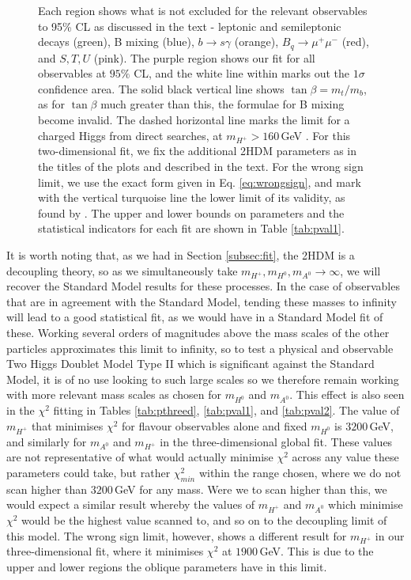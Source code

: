 \documentclass[a4paper,12pt]{article}
\begin{document}
\begin{figure}[ht]
{    Each region shows what is not excluded for the relevant observables to 95\% CL as discussed in the text - leptonic and semileptonic decays (green), B mixing (blue), $b\to s\gamma$ (orange), $B_q\to\mu^+\mu^-$ (red), and $S,T,U$ (pink).
    The purple region shows our fit for all observables at $95\%$ CL, and the white line within marks out the $1\sigma$ confidence area. 
    The solid black vertical line shows $\tan\beta=m_t/m_b$, as for $\tan\beta$ much greater than this, the formulae for B mixing become invalid. 
    The dashed horizontal line marks the limit for a charged Higgs from direct searches, at $m_{H^+}>160\,$GeV \cite{dirhp}.
    For this two-dimensional fit, we fix the additional 2HDM parameters as in the titles of the plots and described in the text. 
    For the wrong sign limit, we use the exact form given in Eq. \ref{eq:wrongsign}, and mark with the vertical turquoise line the lower limit of its validity, as found by \cite{oliver}.
    The upper and lower bounds on parameters and the statistical indicators for each fit are shown in Table \ref{tab:pval1}.}
\end{figure}

It is worth noting that, as we had in Section \ref{subsec:fit}, the 2HDM is a decoupling theory, so as we simultaneously take $m_{H^+},m_{H^0},m_{A^0}\to\infty$, we will recover the Standard Model results for these processes.
In the case of observables that are in agreement with the Standard Model, tending these masses to infinity will lead to a good statistical fit, as we would have in a Standard Model fit of these. 
Working several orders of magnitudes above the mass scales of the other particles approximates this limit to infinity, so to test a physical and observable Two Higgs Doublet Model Type II which is significant against the Standard Model, it is of no use looking to such large scales so we therefore remain working with more relevant mass scales as chosen for $m_{H^0}$ and $m_{A^0}$.
This effect is also seen in the $\chi^2$ fitting in Tables \ref{tab:pthreed}, \ref{tab:pval1}, and \ref{tab:pval2}. 
The value of $m_{H^+}$ that minimises $\chi^2$ for flavour observables alone and fixed $m_{H^0}$ is $3200\,$GeV, and similarly for $m_{A^0}$ and $m_{H^+}$ in the three-dimensional global fit. 
These values are not representative of what would actually minimise $\chi^2$ across any value these parameters could take, but rather $\chi^2_{min}$ within the range chosen, where we do not scan higher than $3200\,$GeV for any mass. 
Were we to scan higher than this, we would expect a similar result whereby the values of $m_{H^+}$ and $m_{A^0}$ which minimise $\chi^2$ would be the highest value scanned to, and so on to the decoupling limit of this model. 
The wrong sign limit, however, shows a different result for $m_{H^+}$ in our three-dimensional fit, where it minimises $\chi^2$ at $1900\,$GeV.
This is due to the upper and lower regions the oblique parameters have in this limit.
\end{document}
